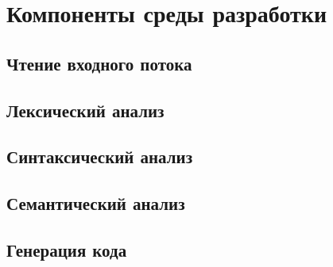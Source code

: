 \section{Компоненты среды разработки}
    \subsection{Чтение входного потока}
    \subsection{Лексический анализ}
    \subsection{Синтаксический анализ}
    \subsection{Семантический анализ}
    \subsection{Генерация кода}
